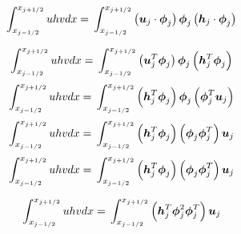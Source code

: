 \documentclass{article}
\newcommand{\vecn}[1]{\boldsymbol{#1}}
\begin{document}
\begin{equation}
\int_{x_{j-1/2}}^{x_{j+1/2}} uhv dx = \\
\int_{x_{j-1/2}}^{x_{j+1/2}} \left(\vecn{u}_j \cdot \vecn{\phi}_j\right) \vecn{\phi}_j \left(\vecn{h}_j \cdot \vecn{\phi}_j\right)  
\end{equation}

\begin{equation}
\int_{x_{j-1/2}}^{x_{j+1/2}} uhv dx = \\
\int_{x_{j-1/2}}^{x_{j+1/2}} \left(\vecn{u}_j^T \vecn{\phi}_j\right) \vecn{\phi}_j \left(\vecn{h}_j^T \vecn{\phi}_j\right)  
\end{equation}
\begin{equation}
\int_{x_{j-1/2}}^{x_{j+1/2}} uhv dx = \\
\int_{x_{j-1/2}}^{x_{j+1/2}} \left(\vecn{h}_j^T \vecn{\phi}_j\right)  \vecn{\phi}_j  \left(\vecn{\phi}_j^T \vecn{u}_j\right) 
\end{equation}
\begin{equation}
\int_{x_{j-1/2}}^{x_{j+1/2}} uhv dx = \\
\int_{x_{j-1/2}}^{x_{j+1/2}} \left(\vecn{h}_j^T \vecn{\phi}_j\right)  \left(\vecn{\phi}_j  \vecn{\phi}_j^T \right) \vecn{u}_j
\end{equation}
\begin{equation}
\int_{x_{j-1/2}}^{x_{j+1/2}} uhv dx = \\
\int_{x_{j-1/2}}^{x_{j+1/2}} \left(\vecn{h}_j^T \vecn{\phi}_j\right)  \left(\vecn{\phi}_j  \vecn{\phi}_j^T \right) \vecn{u}_j
\end{equation}

\begin{equation}
\int_{x_{j-1/2}}^{x_{j+1/2}} uhv dx = \\
\int_{x_{j-1/2}}^{x_{j+1/2}} \left(\vecn{h}_j^T \vecn{\phi}^2_j \vecn{\phi}_j^T \right) \vecn{u}_j
\end{equation}
\end{document}
